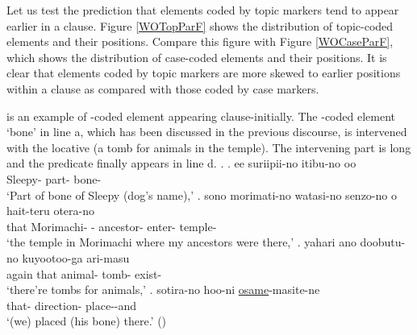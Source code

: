 Let us test the prediction that elements coded by topic markers tend to appear earlier in a clause.
Figure \ref{WOTopParF} shows the distribution of topic-coded elements
and their positions.
Compare this figure with Figure \ref{WOCaseParF},
which shows the distribution of case-coded elements and their positions.
It is clear that
elements coded by topic markers are more skewed to earlier positions within a clause as compared with those coded by case markers.

\Next is an example of -coded element appearing clause-initially.
The -coded element  `bone' in line a,
which has been discussed in the previous discourse,
is intervened with the locative (a tomb for animals in the temple).
The intervening part is long and the predicate finally appears in line d.
%
\ex.
	\ag. ee suriipii-no itibu-no oo  \\
		 Sleepy- part-  bone- \\
		`Part of bone of Sleepy (dog's name),'
	\bg. sono morimati-no watasi-no senzo-no o hait-teru otera-no \\
		that Morimachi- - ancestor-  enter- temple- \\
		`the temple in Morimachi where my ancestors were there,'
	\bg. yahari ano doobutu-no kuyootoo-ga ari-masu \\
		again that animal- tomb- exist- \\
		`there're tombs for animals,'
	\bg. sotira-no hoo-ni \ul{osame}-masite-ne \\
		that- direction- place--and \\
		`(we) placed (his bone) there.'
	\hfill{()}

